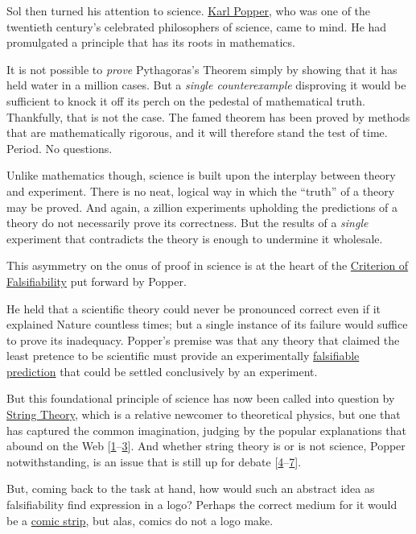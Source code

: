 \documentclass[
  a4paper,
]{article}
\begin{document}
Sol then turned his attention to science.
\href{https://en.wikipedia.org/wiki/Karl_Popper}{Karl Popper}, who was
one of the twentieth century's celebrated philosophers of science, came
to mind. He had promulgated a principle that has its roots in
mathematics.

It is not possible to \emph{prove} Pythagoras's Theorem simply by
showing that it has held water in a million cases. But a \emph{single
counterexample} disproving it would be sufficient to knock it off its
perch on the pedestal of mathematical truth. Thankfully, that is not the
case. The famed theorem has been proved by methods that are
mathematically rigorous, and it will therefore stand the test of time.
Period. No questions.

Unlike mathematics though, science is built upon the interplay between
theory and experiment. There is no neat, logical way in which the
``truth'' of a theory may be proved. And again, a zillion experiments
upholding the predictions of a theory do not necessarily prove its
correctness. But the results of a \emph{single} experiment that
contradicts the theory is enough to undermine it wholesale.

This asymmetry on the onus of proof in science is at the heart of the
\href{https://www.britannica.com/topic/criterion-of-falsifiability}{Criterion
of Falsifiability} put forward by Popper.

He held that a scientific theory could never be pronounced correct even
if it explained Nature countless times; but a single instance of its
failure would suffice to prove its inadequacy. Popper's premise was that
any theory that claimed the least pretence to be scientific must provide
an experimentally
\href{https://en.wikipedia.org/wiki/Falsifiability}{falsifiable
prediction} that could be settled conclusively by an experiment.

But this foundational principle of science has now been called into
question by
\href{https://www.britannica.com/science/string-theory}{String Theory},
which is a relative newcomer to theoretical physics, but one that has
captured the common imagination, judging by the popular explanations
that abound on the Web
{[}\protect\hyperlink{ref-mann2019}{1}--\protect\hyperlink{ref-jones2020}{3}{]}.
And whether string theory is or is not science, Popper notwithstanding,
is an issue that is still up for debate
{[}\protect\hyperlink{ref-siegel2015}{4}--\protect\hyperlink{ref-francis2019}{7}{]}.

But, coming back to the task at hand, how would such an abstract idea as
falsifiability find expression in a logo? Perhaps the correct medium for
it would be a
\href{https://www.explainxkcd.com/wiki/index.php/2078:_Popper}{comic
strip}, but alas, comics do not a logo make.
\end{document}
